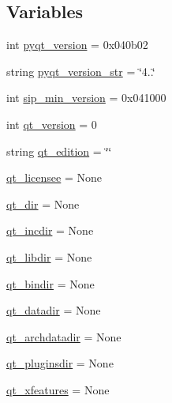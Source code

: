 \subsection*{Variables}
\begin{DoxyCompactItemize}
\item 
int \hyperlink{namespacePyQt-x11-gpl-4_811_82_1_1configure_a604b1b96cc8cb00106af6670cdf8cbad}{pyqt\+\_\+version} = 0x040b02
\item 
string \hyperlink{namespacePyQt-x11-gpl-4_811_82_1_1configure_afaee1b5d25067d8a999b49e9d92db19b}{pyqt\+\_\+version\+\_\+str} = \char`\"{}4..\char`\"{}
\item 
int \hyperlink{namespacePyQt-x11-gpl-4_811_82_1_1configure_afc8e751dbed90dfa56c853fab2c7ea0d}{sip\+\_\+min\+\_\+version} = 0x041000
\item 
int \hyperlink{namespacePyQt-x11-gpl-4_811_82_1_1configure_aeb74c9d74956090a8488042a9d15cb35}{qt\+\_\+version} = 0
\item 
string \hyperlink{namespacePyQt-x11-gpl-4_811_82_1_1configure_a5055d87b33f642de94520cd73e3c20ab}{qt\+\_\+edition} = \char`\"{}\char`\"{}
\item 
\hyperlink{namespacePyQt-x11-gpl-4_811_82_1_1configure_a93db56d722b8f584788605ecf041a498}{qt\+\_\+licensee} = None
\item 
\hyperlink{namespacePyQt-x11-gpl-4_811_82_1_1configure_a68035620849bcf6ead969a8228aa21dc}{qt\+\_\+dir} = None
\item 
\hyperlink{namespacePyQt-x11-gpl-4_811_82_1_1configure_a099ca463dab3529c689b969005cfcf0a}{qt\+\_\+incdir} = None
\item 
\hyperlink{namespacePyQt-x11-gpl-4_811_82_1_1configure_ab0bb0e6dc88261bcf702a5649188d559}{qt\+\_\+libdir} = None
\item 
\hyperlink{namespacePyQt-x11-gpl-4_811_82_1_1configure_ab8b3b63d45391ce2d88137981e5ee83f}{qt\+\_\+bindir} = None
\item 
\hyperlink{namespacePyQt-x11-gpl-4_811_82_1_1configure_ac5db0abc571a6278b414c88f99b211e8}{qt\+\_\+datadir} = None
\item 
\hyperlink{namespacePyQt-x11-gpl-4_811_82_1_1configure_a6d3a56828173d0f5ac958c9c478819ac}{qt\+\_\+archdatadir} = None
\item 
\hyperlink{namespacePyQt-x11-gpl-4_811_82_1_1configure_a1fbae6295e533b27af80df1d0bcf3abc}{qt\+\_\+pluginsdir} = None
\item 
\hyperlink{namespacePyQt-x11-gpl-4_811_82_1_1configure_a35dc855db23e8cda3221ef0dd9563d03}{qt\+\_\+xfeatures} = None

\end{DoxyCompactItemize}
